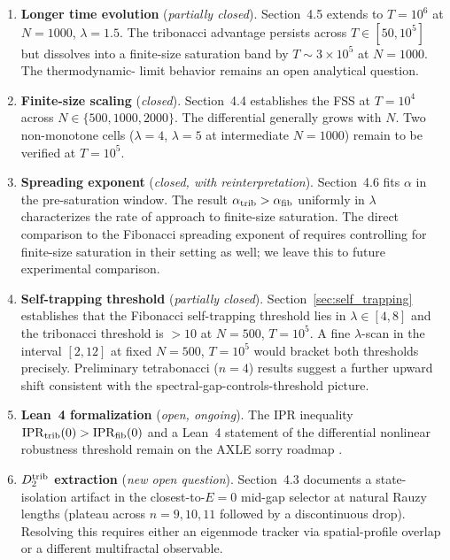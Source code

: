 \documentclass[12pt,a4paper]{article}
\begin{document}
\begin{enumerate}

\item \textbf{Longer time evolution} (\emph{partially closed}). Section~4.5
extends to $T=10^6$ at $N=1000$, $\lambda=1.5$. The tribonacci advantage
persists across $T \in [50, 10^5]$ but dissolves into a finite-size
saturation band by $T \sim 3\times10^5$ at $N=1000$. The thermodynamic-
limit behavior remains an open analytical question.

\item \textbf{Finite-size scaling} (\emph{closed}). Section~4.4 establishes
the FSS at $T=10^4$ across $N \in \{500, 1000, 2000\}$. The differential
generally grows with $N$. Two non-monotone cells ($\lambda=4$, $\lambda=5$
at intermediate $N=1000$) remain to be verified at $T=10^5$.

\item \textbf{Spreading exponent} (\emph{closed, with reinterpretation}).
Section~4.6 fits $\alpha$ in the pre-saturation window. The result
$\alpha_{\rm trib} > \alpha_{\rm fib}$ uniformly in $\lambda$ characterizes
the rate of approach to finite-size saturation. The direct comparison to
the Fibonacci spreading exponent of \cite{Lahini2009} requires controlling
for finite-size saturation in their setting as well; we leave this to
future experimental comparison.

\item \textbf{Self-trapping threshold} (\emph{partially closed}).
Section~\ref{sec:self_trapping} establishes that the Fibonacci
self-trapping threshold lies in $\lambda \in [4, 8]$ and the
tribonacci threshold is $> 10$ at $N=500$, $T=10^5$.
A fine $\lambda$-scan in the interval $[2, 12]$ at fixed $N=500$,
$T=10^5$ would bracket both thresholds precisely. Preliminary
tetrabonacci ($n=4$) results suggest a further upward shift consistent
with the spectral-gap-controls-threshold picture.

\item \textbf{Lean~4 formalization} (\emph{open, ongoing}). The IPR
inequality $\mathrm{IPR}_{\rm trib}(0) > \mathrm{IPR}_{\rm fib}(0)$ and a
Lean~4 statement of the differential nonlinear robustness threshold remain
on the AXLE sorry roadmap \cite{AXLE2026}.

\item \textbf{$D_2^{\rm trib}$ extraction} (\emph{new open question}).
Section~4.3 documents a state-isolation artifact in the closest-to-$E=0$
mid-gap selector at natural Rauzy lengths (plateau across $n=9,10,11$
followed by a discontinuous drop). Resolving this requires either an
eigenmode tracker via spatial-profile overlap or a different multifractal
observable.

\end{enumerate}
\end{document}
